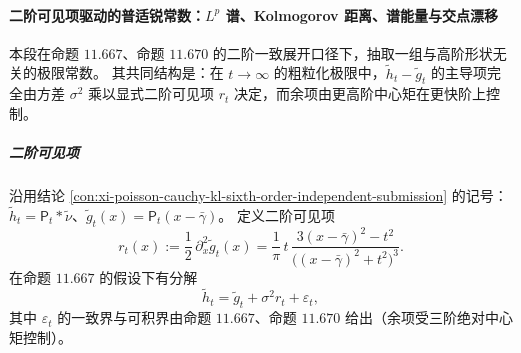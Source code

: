 \paragraph{二阶可见项驱动的普适锐常数：\texorpdfstring{$L^p$}{Lp} 谱、Kolmogorov 距离、谱能量与交点漂移}

本段在命题 \(11.667\)、命题 \(11.670\) 的二阶一致展开口径下，抽取一组与高阶形状无关的极限常数。
其共同结构是：在 \(t\to\infty\) 的粗粒化极限中，\(\tilde h_t-\tilde g_t\) 的主导项完全由方差 \(\sigma^2\) 乘以显式二阶可见项 \(r_t\) 决定，而余项由更高阶中心矩在更快阶上控制。

\subparagraph{二阶可见项}
沿用结论 \ref{con:xi-poisson-cauchy-kl-sixth-order-independent-submission} 的记号：
\(\tilde h_t=\mathsf P_t*\tilde\nu\)、\(\tilde g_t(x)=\mathsf P_t(x-\bar\gamma)\)。
定义二阶可见项
\begin{equation}\label{eq:xi-poisson-cauchy-visible-r2-rt}
r_t(x):=\frac12\,\partial_x^2\tilde g_t(x)
=\frac{1}{\pi}\,t\,\frac{3(x-\bar\gamma)^2-t^2}{\bigl((x-\bar\gamma)^2+t^2\bigr)^3}.
\end{equation}
在命题 \(11.667\) 的假设下有分解
\begin{equation}\label{eq:xi-poisson-cauchy-second-order-splitting-rt}
\tilde h_t=\tilde g_t+\sigma^2 r_t+\varepsilon_t,
\end{equation}
其中 \(\varepsilon_t\) 的一致界与可积界由命题 \(11.667\)、命题 \(11.670\) 给出（余项受三阶绝对中心矩控制）。

